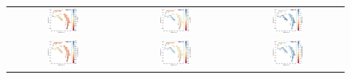 \documentclass{aa}
\begin{document}
\begin{appendix}
\begin{figure}[htbp]
    \centering
    \begin{tabular}{ccc}
        \includegraphics[width=0.3\textwidth]{Plots/tsne_params/tsne_R3_Teff_GES.pdf} & \includegraphics[width=0.3\textwidth]{Plots/tsne_params/tsne_R3_logg_GES.pdf} & \includegraphics[width=0.3\textwidth]{Plots/tsne_params/tsne_R3_FeH_GES.pdf} \\
        \includegraphics[width=0.3\textwidth]{Plots/tsne_params/tsne_R3_Teff_GaiaXGBoost.pdf} & \includegraphics[width=0.3\textwidth]{Plots/tsne_params/tsne_R3_logg_GaiaXGBoost.pdf} & \includegraphics[width=0.3\textwidth]{Plots/tsne_params/tsne_R3_FeH_GaiaXGBoost.pdf} \\

\end{tabular}
\end{figure}
\end{appendix}
\end{document}
